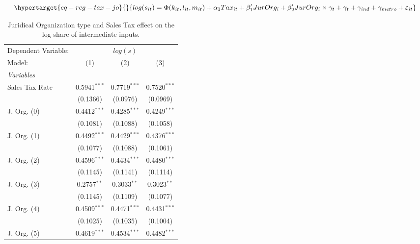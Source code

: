\documentclass[
  12pt]{article}
\begin{document}
\begin{equation}\protect\hypertarget{eq-reg-tax-jo}{}{
log(s_{it})= \Phi(k_{it},l_{it},m_{it})+ \alpha_1Tax_{it}+\mathbf{\beta}_1'JurOrg_i + \beta_2'JurOrg_i\times\gamma_t+ \gamma_t + \gamma_{ind} +\gamma_{metro} + \varepsilon_{it}
}\label{eq-reg-tax-jo}\end{equation}

\begin{table}

\caption{\label{tbl-reg-jo-tax}Juridical Organization type and Sales Tax
effect on the log share of intermediate
inputs.}\begin{minipage}[t]{\linewidth}
\subcaption{\label{tbl-reg-jo-tax-1}}

{\centering 

\begingroup
\centering
\begin{tabular}{lccc}
   \tabularnewline \midrule \midrule
   Dependent Variable: & \multicolumn{3}{c}{\(log(s)\)}\\
   Model:         & (1)            & (2)            & (3)\\  
   \midrule
   \emph{Variables}\\
   Sales Tax Rate & 0.5941$^{***}$ & 0.7719$^{***}$ & 0.7520$^{***}$\\   
                  & (0.1366)       & (0.0976)       & (0.0969)\\   
   J. Org. (0)    & 0.4412$^{***}$ & 0.4285$^{***}$ & 0.4249$^{***}$\\   
                  & (0.1081)       & (0.1088)       & (0.1058)\\   
   J. Org. (1)    & 0.4492$^{***}$ & 0.4429$^{***}$ & 0.4376$^{***}$\\   
                  & (0.1077)       & (0.1088)       & (0.1061)\\   
   J. Org. (2)    & 0.4596$^{***}$ & 0.4434$^{***}$ & 0.4480$^{***}$\\   
                  & (0.1145)       & (0.1141)       & (0.1114)\\   
   J. Org. (3)    & 0.2757$^{**}$  & 0.3033$^{**}$  & 0.3023$^{**}$\\   
                  & (0.1145)       & (0.1109)       & (0.1077)\\   
   J. Org. (4)    & 0.4509$^{***}$ & 0.4471$^{***}$ & 0.4431$^{***}$\\   
                  & (0.1025)       & (0.1035)       & (0.1004)\\   
   J. Org. (5)    & 0.4619$^{***}$ & 0.4534$^{***}$ & 0.4482$^{***}$\\   

\end{tabular}}
\end{minipage}
\end{table}
\end{document}
